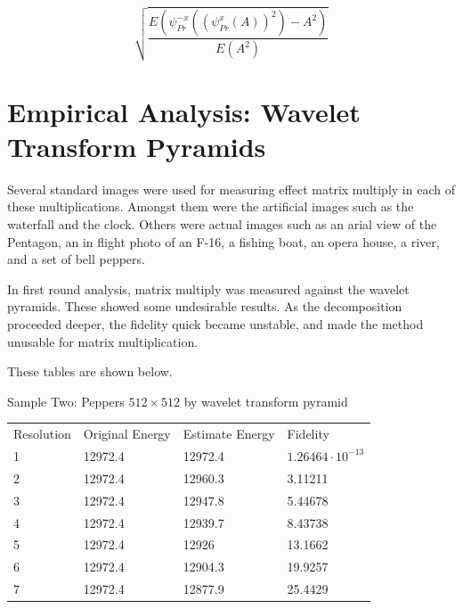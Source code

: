 \[ \sqrt {\frac{E(\psi_{Pr}^{-x} ( (\psi_{Pr}^x (A))^2) - A^2)} {E(A^2)} }  \]


\section {Empirical Analysis: Wavelet Transform Pyramids}

Several standard images were used for measuring effect matrix multiply in each of these multiplications.  Amongst them were the artificial images such as the waterfall and the clock.  Others were actual images such as an arial view of the Pentagon, an in flight photo of an F-16, a fishing boat, an opera house, a river, and a set of bell peppers.

In first round analysis, matrix multiply was measured against the wavelet pyramids.  These showed some undesirable results.  As the decomposition proceeded deeper, the fidelity quick became unstable, and made the method unusable for matrix multiplication.  

These tables are shown below.

Sample Two: Peppers $512 \times 512$ by wavelet transform pyramid 

\begin{tabular}{llll}
{Resolution} & { Original Energy } & { 
Estimate Energy }& { 
Fidelity } \\ 
1&  12972.4& 12972.4 &  $1.26464 \cdot 10^{-13} $ \\ 
2&12972.4  & 12960.3 &  3.11211  \\ 
3& 12972.4 &12947.8  &  5.44678  \\ 
4&12972.4&12939.7&   8.43738 \\
5 &12972.4  & 12926 & 13.1662 \\
6& 12972.4& 12904.3& 19.9257 \\
7& 12972.4 & 12877.9 & 25.4429 \\
\end{tabular}




